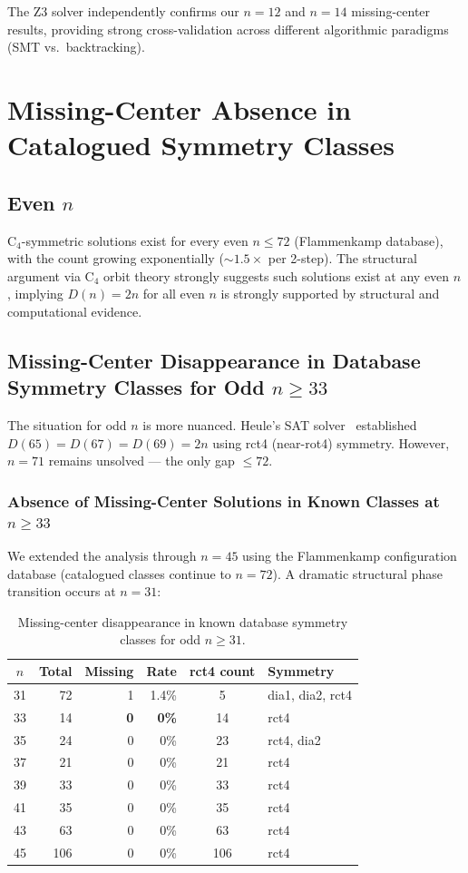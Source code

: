 \documentclass[11pt,a4paper]{article}
\theoremstyle{plain}
\theoremstyle{definition}
\begin{document}
The Z3 solver independently confirms our $n=12$ and $n=14$ missing-center results, providing strong cross-validation across different algorithmic paradigms (SMT vs.\ backtracking).

\section{Missing-Center Absence in Catalogued Symmetry Classes}
\label{sec:extinction}

\subsection{Even $n$}

C$_4$-symmetric solutions exist for every even $n\le 72$ (Flammenkamp database), with the count growing exponentially ($\sim1.5\times$ per 2-step). The structural argument via C$_4$ orbit theory strongly suggests such solutions exist at any even $n$, implying $D(n)=2n$ for all even $n$ is strongly supported by structural and computational evidence.

\subsection{Missing-Center Disappearance in Database Symmetry Classes for Odd $n\ge 33$}

The situation for odd $n$ is more nuanced. Heule's SAT solver~\cite{heule2026} established $D(65)=D(67)=D(69)=2n$ using rct4 (near-rot4) symmetry. However, $n=71$ remains unsolved --- the only gap $\le 72$.

\subsubsection{Absence of Missing-Center Solutions in Known Classes at $n\ge 33$}

We extended the analysis through $n=45$ using the Flammenkamp configuration database (catalogued classes continue to $n=72$). A dramatic structural phase transition occurs at $n=31$:

\begin{table}[H]
\centering
\caption{Missing-center disappearance in known database symmetry classes for odd $n\ge 31$.}
\label{tab:extinct}
\begin{tabular}{crrrcl}
\toprule
$n$ & Total & Missing & Rate & rct4 count & Symmetry \\
\midrule
31 & 72 & 1 & 1.4\% & 5 & dia1, dia2, rct4 \\
33 & 14 & \textbf{0} & \textbf{0\%} & 14 & rct4 \\
35 & 24 & 0 & 0\% & 23 & rct4, dia2 \\
37 & 21 & 0 & 0\% & 21 & rct4 \\
39 & 33 & 0 & 0\% & 33 & rct4 \\
41 & 35 & 0 & 0\% & 35 & rct4 \\
43 & 63 & 0 & 0\% & 63 & rct4 \\
45 & 106 & 0 & 0\% & 106 & rct4 \\
\bottomrule
\end{tabular}
\end{table}
\end{document}
